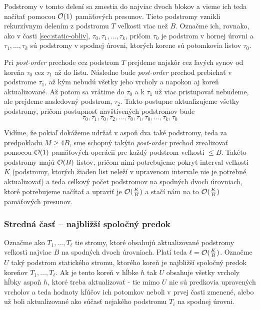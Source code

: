 Podstromy v tomto delení sa zmestia do najviac dvoch blokov a vieme ich teda načítať pomocou $\mathcal{O}(1)$ pamäťových presunov. Tieto podstromy vznikli rekurzívnym  delením z podstromu $T$ veľkosti viac než $B$. Označme ich, rovnako, ako v časti \ref{sec:static-obliv}, $\tau_0, \tau_1, \dotsc, \tau_k$, pričom $\tau_0$ je podstrom v hornej úrovni a $\tau_1,\dotsc,\tau_k$ sú podstromy v spodnej úrovni, ktorých korene sú potomkovia listov $\tau_0$.

Pri \emph{post-order} prechode cez podstrom $T$ prejdeme najskôr cez ľavých synov od koreňa $\tau_0$ cez $\tau_1$ až do listu. Následne bude \emph{post-order} prechod prebiehať v podstrome $\tau_1$, až kým nebudú všetky jeho vrcholy a napokon aj koreň aktualizované. Až potom sa vrátime do $\tau_0$ a k $\tau_1$ už viac pristupovať nebudeme, ale prejdeme nasledovný podstrom, $\tau_2$. Takto postupne aktualizujeme všetky podstromy, pričom postupnosť navštívených podstromov bude
\[
\tau_0, \tau_1, \tau_0, \tau_2, \dotsc, \tau_0, \tau_i, \tau_0, \dotsc, \tau_k, \tau_0
\]

Vidíme, že pokiaľ dokážeme udržať v \cache aspoň dva také podstromy, teda za predpokladu $M \ge 4B$, sme schopný takýto \emph{post-order} prechod zrealizovať pomocou $\mathcal{O}(1)$ pamäťových operácii pre každý podstrom veľkosti $\le B$. Takéto podstromy majú $\mathcal{O}(B)$ listov, pričom  nimi potrebujeme pokryť interval veľkosti $K$ (podstromy, ktorých žiaden list neleží v upravenom intervale nie je potrebné aktualizovať) a teda celkový počet podstromov na spodných dvoch úrovniach, ktoré potrebujeme načítať a upraviť je $\mathcal{O}(\frac{K}{B})$ a stačí nám na to $\mathcal{O}(\frac{K}{B})$ pamäťových presunov.

\subsubsection{Stredná časť -- najbližší spoločný predok}
Označme ako $T_1,\dotsc,T_\ell$ tie stromy, ktoré obsahujú aktualizované podstromy veľkosti najviac $B$ na spodných dvoch úrovniach. Platí teda $\ell = \mathcal{O}(\frac{K}{B})$. Označme $U$ taký podstrom statického stromu, ktorého koreň je najbližší spoločný predok koreňov $T_1,\dotsc,T_\ell$. Ak je tento koreň v hĺbke $h$ tak $U$ obsahuje všetky vrcholy hĺbky aspoň $h$, ktoré treba aktualizovať - tie mimo $U$ nie sú predkovia upravených vrcholov a teda hodnoty kľúčov ich potomkov neboli v prvej časti zmenené, alebo už boli aktualizované ako súčasť nejakého podstromu $T_i$ na spodnej úrovni.

